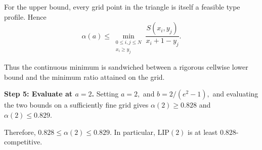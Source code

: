 \documentclass{article}
\begin{document}
For the upper bound, every grid point in the triangle is itself a feasible type profile. Hence
\[
\alpha(a)
\le
\min_{\substack{0\le i,j\le N\\x_i\ge y_j}}
\frac{S(x_i,y_j)}{x_i+1-y_j}.
\]

Thus the continuous minimum is sandwiched between a rigorous cellwise lower bound and the minimum ratio attained on the grid.

\textbf{Step 5: Evaluate at $a=2$.}
Setting $a=2,$ and $b={2}/({e^2-1}),$ and evaluating the two bounds on a sufficiently fine grid gives $\alpha(2)\ge0.828$ and $\alpha(2)\le0.829.$

Therefore, $\boxed{0.828\le\alpha(2)\le0.829.}$
In particular, $\mathrm{LIP}(2)$ is at least $0.828$-competitive.








\end{document}
